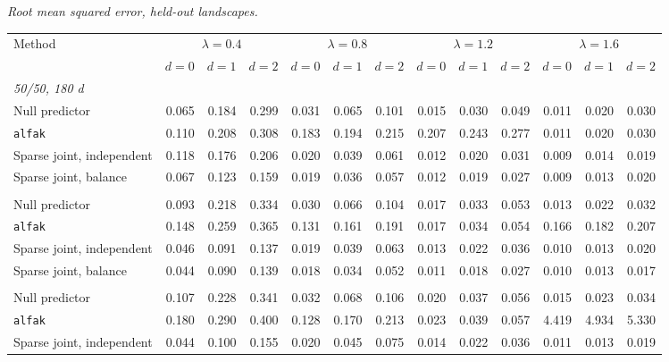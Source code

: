 \noindent\textit{Root mean squared error, held-out landscapes.}
\begin{center}
\scriptsize
\setlength{\tabcolsep}{2.5pt}
\begin{tabular}{l*{12}{r}}
\toprule
Method & \multicolumn{3}{c}{$\lambda=0.4$} & \multicolumn{3}{c}{$\lambda=0.8$} & \multicolumn{3}{c}{$\lambda=1.2$} & \multicolumn{3}{c}{$\lambda=1.6$} \\
\cmidrule(lr){2-4}\cmidrule(lr){5-7}\cmidrule(lr){8-10}\cmidrule(lr){11-13}
 & $d=0$ & $d=1$ & $d=2$ & $d=0$ & $d=1$ & $d=2$ & $d=0$ & $d=1$ & $d=2$ & $d=0$ & $d=1$ & $d=2$ \\
\midrule
\multicolumn{13}{l}{\textit{50/50, 180 d}} \\
\quad Null predictor & 0.065 & 0.184 & 0.299 & 0.031 & 0.065 & 0.101 & 0.015 & 0.030 & 0.049 & 0.011 & 0.020 & 0.030 \\
\quad \texttt{alfak} & 0.110 & 0.208 & 0.308 & 0.183 & 0.194 & 0.215 & 0.207 & 0.243 & 0.277 & 0.011 & 0.020 & 0.030 \\
\quad Sparse joint, independent & 0.118 & 0.176 & 0.206 & 0.020 & 0.039 & 0.061 & 0.012 & 0.020 & 0.031 & 0.009 & 0.014 & 0.019 \\
\quad Sparse joint, balance & 0.067 & 0.123 & 0.159 & 0.019 & 0.036 & 0.057 & 0.012 & 0.019 & 0.027 & 0.009 & 0.013 & 0.020 \\
\addlinespace[2pt]
\multicolumn{13}{l}{\textit{200/200, 180 d}} \\
\quad Null predictor & 0.093 & 0.218 & 0.334 & 0.030 & 0.066 & 0.104 & 0.017 & 0.033 & 0.053 & 0.013 & 0.022 & 0.032 \\
\quad \texttt{alfak} & 0.148 & 0.259 & 0.365 & 0.131 & 0.161 & 0.191 & 0.017 & 0.034 & 0.054 & 0.166 & 0.182 & 0.207 \\
\quad Sparse joint, independent & 0.046 & 0.091 & 0.137 & 0.019 & 0.039 & 0.063 & 0.013 & 0.022 & 0.036 & 0.010 & 0.013 & 0.020 \\
\quad Sparse joint, balance & 0.044 & 0.090 & 0.139 & 0.018 & 0.034 & 0.052 & 0.011 & 0.018 & 0.027 & 0.010 & 0.013 & 0.017 \\
\addlinespace[2pt]
\multicolumn{13}{l}{\textit{200/200, 360 d}} \\
\quad Null predictor & 0.107 & 0.228 & 0.341 & 0.032 & 0.068 & 0.106 & 0.020 & 0.037 & 0.056 & 0.015 & 0.023 & 0.034 \\
\quad \texttt{alfak} & 0.180 & 0.290 & 0.400 & 0.128 & 0.170 & 0.213 & 0.023 & 0.039 & 0.057 & 4.419 & 4.934 & 5.330 \\
\quad Sparse joint, independent & 0.044 & 0.100 & 0.155 & 0.020 & 0.045 & 0.075 & 0.014 & 0.022 & 0.036 & 0.011 & 0.013 & 0.019 \\

\end{tabular}
\end{center}
